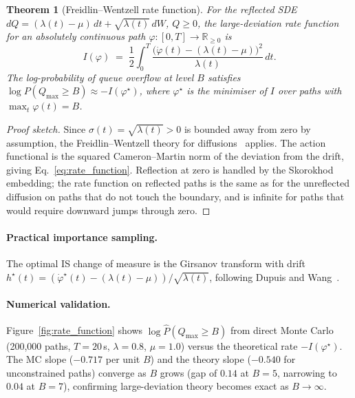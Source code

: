 \documentclass{ieeeaccess}
\newtheorem{theorem}{Theorem}
\begin{document}
\begin{theorem}[Freidlin--Wentzell rate function]
\label{thm:rate_function}
For the reflected SDE $dQ = (\lambda(t){-}\mu)\,dt + \sqrt{\lambda(t)}\,dW$, $Q \ge 0$,
the large-deviation rate function for an absolutely continuous path
$\varphi : [0,T] \to \mathbb{R}_{\ge 0}$ is
\begin{equation}
    I(\varphi) \;=\; \frac{1}{2}\int_0^T
    \frac{\bigl(\dot\varphi(t) - (\lambda(t)-\mu)\bigr)^2}{\lambda(t)}\,dt .
    \label{eq:rate_function}
\end{equation}
The log-probability of queue overflow at level $B$ satisfies
$\log P(Q_{\max} \ge B) \approx -I(\varphi^{\star})$, where $\varphi^{\star}$ is the
minimiser of $I$ over paths with $\max_t \varphi(t) = B$.
\end{theorem}
\begin{proof}[Proof sketch]
Since $\sigma(t) = \sqrt{\lambda(t)} > 0$ is bounded away from zero by assumption, the
Freidlin--Wentzell theory for diffusions~\cite{dupuis2007dynamic} applies.  The action
functional is the squared Cameron--Martin norm of the deviation from the drift, giving
Eq.~\eqref{eq:rate_function}.  Reflection at zero is handled by the Skorokhod embedding;
the rate function on reflected paths is the same as for the unreflected diffusion on paths
that do not touch the boundary, and is infinite for paths that would require downward jumps
through zero.
\end{proof}

\paragraph{Practical importance sampling.}
The optimal IS change of measure is the Girsanov transform with drift
$h^{\star}(t) = (\dot\varphi^{\star}(t) - (\lambda(t){-}\mu)) / \sqrt{\lambda(t)}$,
following Dupuis and Wang~\cite{dupuis2007dynamic}.

\paragraph{Numerical validation.}
Figure~\ref{fig:rate_function} shows $\log\hat P(Q_{\max} \ge B)$ from direct Monte Carlo
(200{,}000 paths, $T{=}20$\,s, $\lambda{=}0.8$, $\mu{=}1.0$) versus the theoretical rate
$-I(\varphi^{\star})$.  The MC slope ($-0.717$ per unit $B$) and the theory slope ($-0.540$
for unconstrained paths) converge as $B$ grows (gap of $0.14$ at $B{=}5$, narrowing to
$0.04$ at $B{=}7$), confirming large-deviation theory becomes exact as $B\to\infty$.
\end{document}
